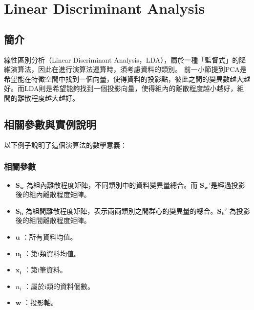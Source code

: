 \chapter{Linear Discriminant Analysis}
\label{chapter:lda}
\section{簡介}
\label{sec:LdaIntroduction}





線性區別分析（Linear Discriminant Analysis，LDA），屬於一種「監督式」的降維演算法，因此在進行演算法運算時，須考慮資料的類別。
前一小節提到PCA是希望能在特徵空間中找到一個向量，使得資料的投影點，彼此之間的變異數越大越好。而LDA則是希望能夠找到一個投影向量，使得組內的離散程度越小越好，組間的離散程度越大越好。




\section{相關參數與實例說明}
以下例子說明了這個演算法的數學意義：

\subsection{相關參數}

\begin{itemize}
	\item
	      \(\mathbf{S_w}\) 為組內離散程度矩陣，不同類別中的資料變異量總合。而 \(\mathbf{{S_w}'}\)是經過投影後的組內離散程度矩陣。
	\item
	      \(\mathbf{S_b}\) 為組間離散程度矩陣，表示兩兩類別之間群心的變異量的總合。\(\mathbf{{S_b}'}\) 為投影後的組間離散程度矩陣。
	\item
	      \(\mathbf{u}\) ：所有資料均值。
	\item
	      \(\mathbf{u_i}\) ：第i類資料均值。
	\item
	      \(\mathbf{x_i}\) ：第i筆資料。
	\item
	      \(n_i\) ：屬於i類的資料個數。
	\item
	      \(\mathbf{w}\) ：投影軸。
\end{itemize}

